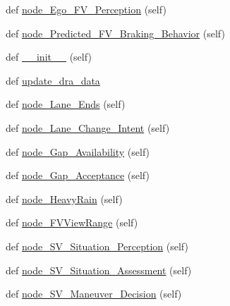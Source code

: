 \begin{DoxyCompactItemize}
\item 
def \hyperlink{classbayesian__network__config_1_1_bayesian_network_config_aff3733f4b57dcb4c4cbc0184ea07c133}{node\+\_\+\+Ego\+\_\+\+F\+V\+\_\+\+Perception} (self)
\item 
def \hyperlink{classbayesian__network__config_1_1_bayesian_network_config_a2f2e6cb9c1179565953917ff4f56935c}{node\+\_\+\+Predicted\+\_\+\+F\+V\+\_\+\+Braking\+\_\+\+Behavior} (self)
\item 
def \hyperlink{classbayesian__network__config_1_1_bayesian_network_config_aeee7107b8b3f2b2cd42c3d57fb4235c3}{\+\_\+\+\_\+init\+\_\+\+\_\+} (self)
\item 
def \hyperlink{classbayesian__network__config_1_1_bayesian_network_config_a5324414961900ca2eede9cc160a24ff7}{update\+\_\+dra\+\_\+data}
\item 
def \hyperlink{classbayesian__network__config_1_1_bayesian_network_config_a9a6e2aefc96155fcdd4a825b1defbe76}{node\+\_\+\+Lane\+\_\+\+Ends} (self)
\item 
def \hyperlink{classbayesian__network__config_1_1_bayesian_network_config_a597ae7d023043c246dc2e31ceb125eec}{node\+\_\+\+Lane\+\_\+\+Change\+\_\+\+Intent} (self)
\item 
def \hyperlink{classbayesian__network__config_1_1_bayesian_network_config_a86c973a53f1f78567b32ffa68cea467a}{node\+\_\+\+Gap\+\_\+\+Availability} (self)
\item 
def \hyperlink{classbayesian__network__config_1_1_bayesian_network_config_a86c960e95351259be8f751f98ac91aa5}{node\+\_\+\+Gap\+\_\+\+Acceptance} (self)
\item 
def \hyperlink{classbayesian__network__config_1_1_bayesian_network_config_a7e92e0763a594ce2d1ac0e6cf4ed6658}{node\+\_\+\+Heavy\+Rain} (self)
\item 
def \hyperlink{classbayesian__network__config_1_1_bayesian_network_config_a14bac441795a8f3c96df9342dff6ecc2}{node\+\_\+\+F\+V\+View\+Range} (self)
\item 
def \hyperlink{classbayesian__network__config_1_1_bayesian_network_config_a1eb21f6bfb872d4c8773615d265c3727}{node\+\_\+\+S\+V\+\_\+\+Situation\+\_\+\+Perception} (self)
\item 
def \hyperlink{classbayesian__network__config_1_1_bayesian_network_config_a542c4ed5d49ca145684cfcff7a6e90f6}{node\+\_\+\+S\+V\+\_\+\+Situation\+\_\+\+Assessment} (self)
\item 
def \hyperlink{classbayesian__network__config_1_1_bayesian_network_config_a978dd92b9826d22d6e521630d0a34379}{node\+\_\+\+S\+V\+\_\+\+Maneuver\+\_\+\+Decision} (self)

\end{DoxyCompactItemize}
